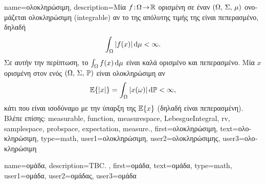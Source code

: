 {name={\foreignlanguage{greek}{ολοκληρώσιμη}},
	description={\foreignlanguage{greek}{Μία}   $f\!:\!\Omega \!\to\! \mathbb{R}$ 
		\foreignlanguage{greek}{ορισμένη σε έναν}  $(\Omega, \,\Sigma, \,\mu)$ 
		\foreignlanguage{greek}{ονομάζεται ολοκληρώσιμη} (integrable) 
		\foreignlanguage{greek}{αν το}  \foreignlanguage{greek}{της απόλυτης τιμής της 
		είναι πεπερασμένο, δηλαδή}
		\[
		\int_{\Omega} |f(x)|\,\mathrm{d}\mu < \infty.
		\]
		\foreignlanguage{greek}{Σε αυτήν την περίπτωση, το}  $\int_{\Omega} f(x)\,\mathrm{d}\mu$ 
		\foreignlanguage{greek}{είναι καλά ορισμένο και πεπερασμένο. Μία}  $x$ \foreignlanguage{greek}{ορισμένη στον} 
		 \foreignlanguage{greek}{ενός}  $(\Omega, \,\Sigma, \,\mathbb{P})$ 
		\foreignlanguage{greek}{είναι ολοκληρώσιμη αν}
		\[
		\mathbb{E}\{|x|\}
		= \int_{\Omega} |x(\omega)|\,\mathrm{d}\mathbb{P} 
		< \infty,
		\]
		\foreignlanguage{greek}{κάτι που είναι ισοδύναμο με την ύπαρξη της}  $\mathbb{E}\{x\}$ 
		\foreignlanguage{greek}{(δηλαδή είναι πεπερασμένη).}
		\\ 
		\foreignlanguage{greek}{Βλέπε επίσης:} \gls{measurable}, \gls{function}, \gls{measurespace}, \gls{LebesgueIntegral}, \gls{rv}, 
		\gls{samplespace}, \gls{probspace}, \gls{expectation}, \gls{measure}.},
	first={\foreignlanguage{greek}{ολοκληρώσιμη}},
	text={\foreignlanguage{greek}{ολοκληρώσιμη}},
	type=math, 
	user1={\foreignlanguage{greek}{ολοκληρώσιμη}}, %
  	user2={\foreignlanguage{greek}{ολοκληρώσιμης}}, %
	user3={\foreignlanguage{greek}{ολοκληρώσιμη}} %
}

{name={\foreignlanguage{greek}{ομάδα}},
	description={TBC. },
	first={\foreignlanguage{greek}{ομάδα}},
	text={\foreignlanguage{greek}{ομάδα}},
	type=math, 
	user1={\foreignlanguage{greek}{ομάδα}}, %
  	user2={\foreignlanguage{greek}{ομάδας}}, %
	user3={\foreignlanguage{greek}{ομάδα}} %
}

